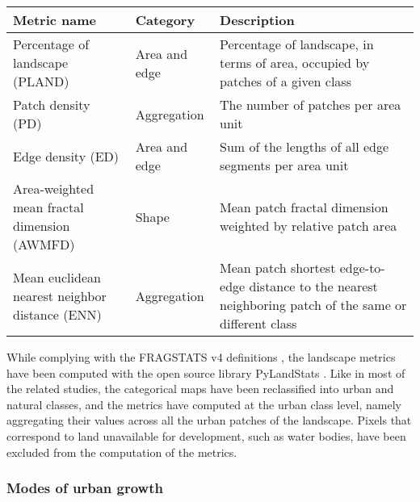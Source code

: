 \begin{table}[!h]
  \begin{tabular}{p{} p{} p{}} 
    \toprule
    \textbf{Metric name} & \textbf{Category} & \textbf{Description} \\
    \midrule
    Percentage of landscape (PLAND) & Area and edge & Percentage of landscape, in terms of area, occupied by patches of a given class \\
    Patch density (PD) & Aggregation & The number of patches per area unit \\
    Edge density (ED) & Area and edge & Sum of the lengths of all edge segments per area unit \\
    Area-weighted mean fractal dimension (AWMFD) & Shape & Mean patch fractal dimension weighted by relative patch area \\
    Mean euclidean nearest neighbor distance (ENN) & Aggregation & Mean patch shortest edge-to-edge distance to the nearest neighboring patch of the same or different class \\
    \bottomrule  
  \end{tabular}    
\end{table}

While complying with the FRAGSTATS v4 definitions \citep{mcgarigal2012fragstats}, the landscape metrics have been computed with the open source library PyLandStats \citep{bosch2019pylandstats}.
Like in most of the related studies, the categorical maps have been reclassified into urban and natural classes, and the metrics have computed at the urban class level, namely aggregating their values across all the urban patches of the landscape.
Pixels that correspond to land unavailable for development, such as water bodies, have been excluded from the computation of the metrics.

\subsubsection*{Modes of urban growth}

